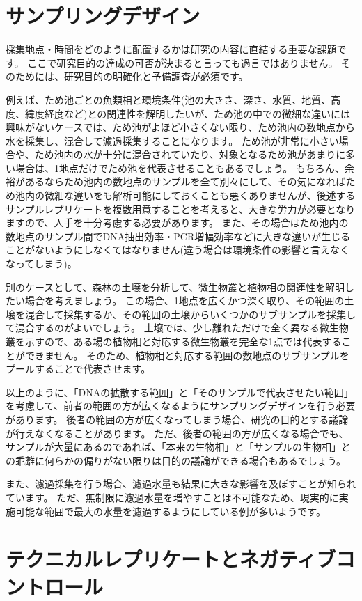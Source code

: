 \documentclass[titlepage,10pt,a4paper,uplatex]{jsbook}
\begin{document}
\section{サンプリングデザイン}

採集地点・時間をどのように配置するかは研究の内容に直結する重要な課題です。
ここで研究目的の達成の可否が決まると言っても過言ではありません。
そのためには、研究目的の明確化と予備調査が必須です。

例えば、ため池ごとの魚類相と環境条件(池の大きさ、深さ、水質、地質、高度、緯度経度など)との関連性を解明したいが、ため池の中での微細な違いには興味がないケースでは、ため池がよほど小さくない限り、ため池内の数地点から水を採集し、混合して濾過採集することになります。
ため池が非常に小さい場合や、ため池内の水が十分に混合されていたり、対象となるため池があまりに多い場合は、1地点だけでため池を代表させることもあるでしょう。
もちろん、余裕があるならため池内の数地点のサンプルを全て別々にして、その気になればため池内の微細な違いをも解析可能にしておくことも悪くありませんが、後述するサンプルレプリケートを複数用意することを考えると、大きな労力が必要となりますので、人手を十分考慮する必要があります。
また、その場合はため池内の数地点のサンプル間でDNA抽出効率・PCR増幅効率などに大きな違いが生じることがないようにしなくてはなりません(違う場合は環境条件の影響と言えなくなってしまう)。

別のケースとして、森林の土壌を分析して、微生物叢と植物相の関連性を解明したい場合を考えましょう。
この場合、1地点を広くかつ深く取り、その範囲の土壌を混合して採集するか、その範囲の土壌からいくつかのサブサンプルを採集して混合するのがよいでしょう。
土壌では、少し離れただけで全く異なる微生物叢を示すので、ある場の植物相と対応する微生物叢を完全な1点では代表することができません。
そのため、植物相と対応する範囲の数地点のサブサンプルをプールすることで代表させます。

以上のように、「DNAの拡散する範囲」と「そのサンプルで代表させたい範囲」を考慮して、前者の範囲の方が広くなるようにサンプリングデザインを行う必要があります。
後者の範囲の方が広くなってしまう場合、研究の目的とする議論が行えなくなることがあります。
ただ、後者の範囲の方が広くなる場合でも、サンプルが大量にあるのであれば、「本来の生物相」と「サンプルの生物相」との乖離に何らかの偏りがない限りは目的の議論ができる場合もあるでしょう。

また、濾過採集を行う場合、濾過水量も結果に大きな影響を及ぼすことが知られています。
ただ、無制限に濾過水量を増やすことは不可能なため、現実的に実施可能な範囲で最大の水量を濾過するようにしている例が多いようです。

\section{テクニカルレプリケートとネガティブコントロール}
\end{document}
